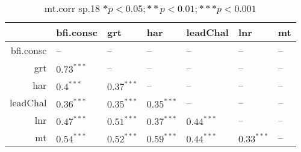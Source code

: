 \begin{table}[ht]
\centering
\begin{tabular}{rllllll}
  \hline
 & bfi.consc & grt & har & leadChal & lnr & mt \\ 
  \hline
bfi.consc & -- & -- & -- & -- & -- & -- \\ 
  grt & $0.73^{***}$ & -- & -- & -- & -- & -- \\ 
  har & $0.4^{***}$ & $0.37^{***}$ & -- & -- & -- & -- \\ 
  leadChal & $0.36^{***}$ & $0.35^{***}$ & $0.35^{***}$ & -- & -- & -- \\ 
  lnr & $0.47^{***}$ & $0.51^{***}$ & $0.37^{***}$ & $0.44^{***}$ & -- & -- \\ 
  mt & $0.54^{***}$ & $0.52^{***}$ & $0.59^{***}$ & $0.44^{***}$ & $0.33^{***}$ & -- \\ 
   \hline
\end{tabular}
\caption{mt.corr sp.18 $* p < 0.05; ** p < 0.01; *** p < 0.001$} 
\label{freq_corr.mt.corr.sp.18}
\end{table}
